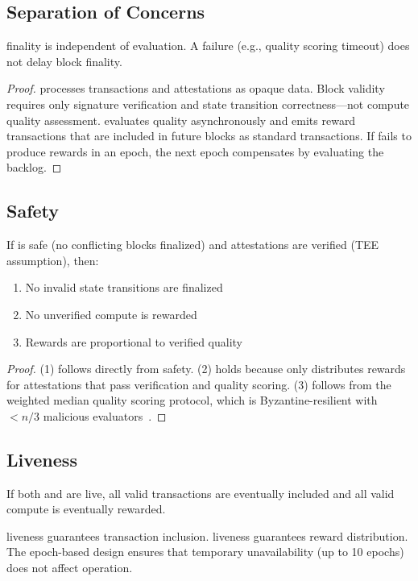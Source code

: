 \subsection{Separation of Concerns}

\begin{theorem}[Independence]
\Quasar{} finality is independent of \PoAI{} evaluation. A \PoAI{} failure (e.g., quality scoring timeout) does not delay block finality.
\end{theorem}

\begin{proof}
\Quasar{} processes transactions and attestations as opaque data. Block validity requires only signature verification and state transition correctness---not compute quality assessment. \PoAI{} evaluates quality asynchronously and emits reward transactions that are included in future blocks as standard transactions. If \PoAI{} fails to produce rewards in an epoch, the next epoch compensates by evaluating the backlog.
\end{proof}

\subsection{Safety}

\begin{theorem}
If \Quasar{} is safe (no conflicting blocks finalized) and \PoAI{} attestations are verified (TEE assumption), then:
\begin{enumerate}
    \item No invalid state transitions are finalized
    \item No unverified compute is rewarded
    \item Rewards are proportional to verified quality
\end{enumerate}
\end{theorem}

\begin{proof}
(1) follows directly from \Quasar{} safety. (2) holds because \PoAI{} only distributes rewards for attestations that pass \TEE{} verification and quality scoring. (3) follows from the weighted median quality scoring protocol, which is Byzantine-resilient with $< n/3$ malicious evaluators~\cite{zoo-poai-consensus}.
\end{proof}

\subsection{Liveness}

\begin{theorem}
If both \Quasar{} and \PoAI{} are live, all valid transactions are eventually included and all valid compute is eventually rewarded.
\end{theorem}

\Quasar{} liveness guarantees transaction inclusion. \PoAI{} liveness guarantees reward distribution. The epoch-based design ensures that temporary \PoAI{} unavailability (up to 10 epochs) does not affect \Quasar{} operation.

